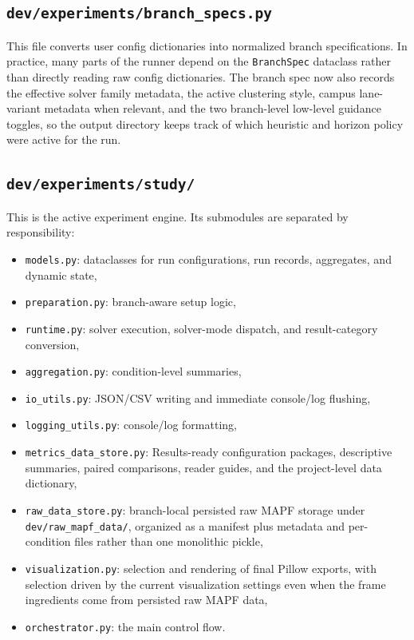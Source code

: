 \documentclass[11pt]{article}
\begin{document}
\subsection{\texttt{dev/experiments/branch\_specs.py}}

This file converts user config dictionaries into normalized branch specifications. In practice, many parts of the runner depend on the \texttt{BranchSpec} dataclass rather than directly reading raw config dictionaries. The branch spec now also records the effective solver family metadata, the active clustering style, campus lane-variant metadata when relevant, and the two branch-level low-level guidance toggles, so the output directory keeps track of which heuristic and horizon policy were active for the run.

\subsection{\texttt{dev/experiments/study/}}

This is the active experiment engine. Its submodules are separated by responsibility:
\begin{itemize}[leftmargin=2em]
    \item \texttt{models.py}: dataclasses for run configurations, run records, aggregates, and dynamic state,
    \item \texttt{preparation.py}: branch-aware setup logic,
    \item \texttt{runtime.py}: solver execution, solver-mode dispatch, and result-category conversion,
    \item \texttt{aggregation.py}: condition-level summaries,
    \item \texttt{io\_utils.py}: JSON/CSV writing and immediate console/log flushing,
    \item \texttt{logging\_utils.py}: console/log formatting,
    \item \texttt{metrics\_data\_store.py}: Results-ready configuration packages, descriptive summaries, paired comparisons, reader guides, and the project-level data dictionary,
    \item \texttt{raw\_data\_store.py}: branch-local persisted raw MAPF storage under \texttt{dev/raw\_mapf\_data/}, organized as a manifest plus metadata and per-condition files rather than one monolithic pickle,
    \item \texttt{visualization.py}: selection and rendering of final Pillow exports, with selection driven by the current visualization settings even when the frame ingredients come from persisted raw MAPF data,
    \item \texttt{orchestrator.py}: the main control flow.
\end{itemize}
\end{document}
